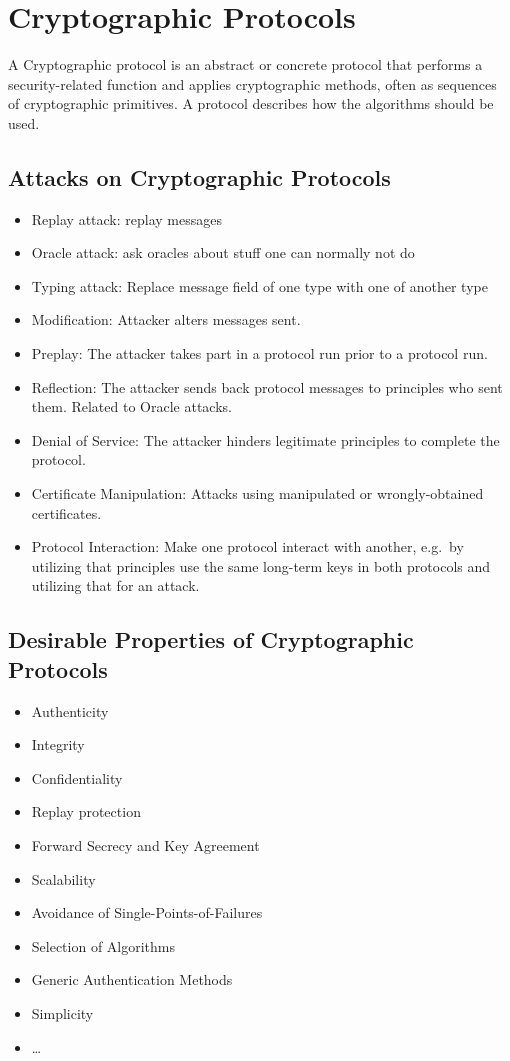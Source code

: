 
\section{Cryptographic Protocols}
A Cryptographic protocol is an abstract or concrete protocol that performs a security-related function and applies cryptographic methods, often as sequences of cryptographic primitives.
A protocol describes how the algorithms should be used. 

\subsection{Attacks on Cryptographic Protocols}
\begin{itemize}[noitemsep, topsep=0pt]
  \item Replay attack: replay messages
  \item Oracle attack: ask oracles about stuff one can normally not do
  \item Typing attack: Replace message field of one type with one of another type
  \item Modification: Attacker alters messages sent.
  \item Preplay: The attacker takes part in a protocol run prior to a protocol run.
  \item Reflection: The attacker sends back protocol messages to principles who sent them. Related to Oracle attacks.
  \item Denial of Service: The attacker hinders legitimate principles to complete the protocol.
  \item Certificate Manipulation: Attacks using manipulated or wrongly-obtained certificates.
  \item Protocol Interaction: Make one protocol interact with another, e.g.\ by utilizing that principles use the same long-term keys in both protocols and utilizing that for an attack.
\end{itemize}

\subsection{Desirable Properties of Cryptographic Protocols}
\begin{itemize}[noitemsep, topsep=0pt]
  \item Authenticity
  \item Integrity
  \item Confidentiality
  \item Replay protection
  \item Forward Secrecy and Key Agreement
  \item Scalability
  \item Avoidance of Single-Points-of-Failures
  \item Selection of Algorithms
  \item Generic Authentication Methods
  \item Simplicity
  \item \dots
\end{itemize}


